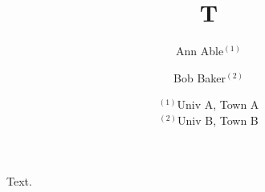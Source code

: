 \documentclass{article}
\title{T}
\author{Ann Able$^{(1)}$ \and Bob Baker$^{(2)}$}
\date{$^{(1)}$Univ A, Town A \\ $^{(2)}$Univ B, Town B}
\begin{document}
\maketitle
Text.
\end{document}

